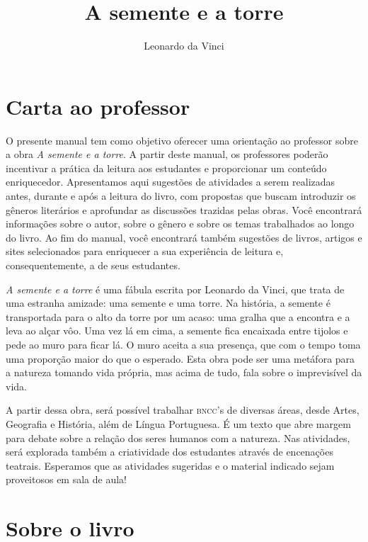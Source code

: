 \documentclass[11pt]{extarticle}
\newcommand{\AutorLivro}{Leonardo da Vinci}
\newcommand{\TituloLivro}{A semente e a torre}
\newcommand{\colaborador}{Ana Lancman}
\begin{document}
\title{\TituloLivro}
\author{\AutorLivro}
\def\authornotes{\colaborador}

\date{}
\maketitle

\tableofcontents

\section{Carta ao professor}

O presente manual tem como objetivo oferecer uma orientação ao professor sobre a obra \textit{A semente e a torre}. A partir deste manual, os professores poderão incentivar a prática da leitura aos estudantes e proporcionar um conteúdo enriquecedor. Apresentamos aqui sugestões de atividades a serem realizadas antes, durante e após a leitura do livro, com propostas que buscam introduzir os gêneros literários e aprofundar as discussões trazidas pelas obras. Você encontrará informações sobre o autor, sobre o gênero e sobre os temas trabalhados ao longo do livro. Ao fim do manual, você encontrará também sugestões de livros, artigos e sites selecionados para enriquecer a sua experiência de leitura e, consequentemente, a de seus estudantes.

\textit{A semente e a torre} é uma fábula escrita por Leonardo da Vinci, que trata de uma estranha amizade: uma semente e uma torre. Na história, a semente é transportada para o alto da torre por um acaso: uma gralha que a encontra e a leva ao alçar vôo. Uma vez lá em cima, a semente fica encaixada entre tijolos e pede ao muro para ficar lá. O muro aceita a sua presença, que com o tempo toma uma proporção maior do que o esperado. Esta obra pode ser uma metáfora para a natureza tomando vida própria, mas acima de tudo, fala sobre o imprevisível da vida.

A partir dessa obra, será possível trabalhar \textsc{bncc}'s de diversas áreas, desde Artes, Geografia e História, além de Língua Portuguesa. É um texto que abre margem para debate sobre a relação dos seres humanos com a natureza. Nas atividades, será explorada também a criatividade dos estudantes através de encenações teatrais. Esperamos que as atividades sugeridas e o material indicado sejam proveitosos em sala de aula! 

\section{Sobre o livro}
\end{document}
